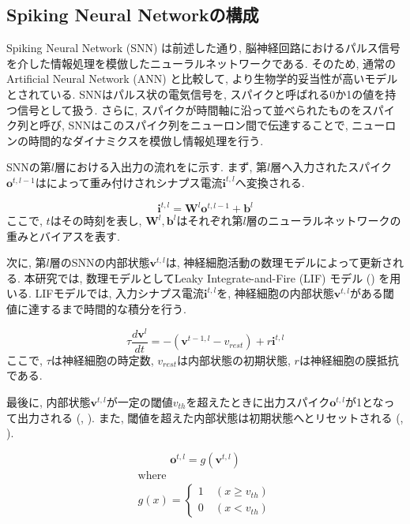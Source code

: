 \subsection{Spiking Neural Networkの構成}

Spiking Neural Network (SNN) は前述した通り, 脳神経回路におけるパルス信号を介した情報処理を模倣したニューラルネットワークである\cite{generalsnn}.
そのため, 通常のArtificial Neural Network (ANN) と比較して, より生物学的妥当性が高いモデルとされている.
SNNはパルス状の電気信号を, スパイクと呼ばれる0か1の値を持つ信号として扱う.
さらに, スパイクが時間軸に沿って並べられたものをスパイク列と呼び, SNNはこのスパイク列をニューロン間で伝達することで, ニューロンの時間的なダイナミクスを模倣し情報処理を行う.

SNNの第$l$層における入出力の流れをに示す.
まず, 第$l$層へ入力されたスパイク$\bm{o}^{t, l-1}$はによって重み付けされシナプス電流$\bm{i}^{t,l}$へ変換される.

\begin{equation}
    \bm{i}^{t, l} = \bm{W}^l\bm{o}^{t, l-1} + \bm{b}^l
    \label{eq:input_spike}
\end{equation}
ここで, $t$はその時刻を表し, $\bm{W}^l, \bm{b}^l$はそれぞれ第$l$層のニューラルネットワークの重みとバイアスを表す.

次に, 第$l$層のSNNの内部状態$\bm{v}^{t, l}$は, 神経細胞活動の数理モデルによって更新される.
本研究では, 数理モデルとしてLeaky Integrate-and-Fire (LIF) モデル () を用いる.
LIFモデルでは, 入力シナプス電流$\bm{i}^{t, l}$を, 神経細胞の内部状態$\bm{v}^{t, l}$がある閾値に達するまで時間的な積分を行う.

\begin{equation}
    {\tau}\frac{d\bm{v}^l}{dt}=-\left(\bm{v}^{t-1,l}-v_{rest}\right)+r\bm{i}^{t, l}
    \label{eq:lif}
\end{equation}
ここで, $\tau$は神経細胞の時定数, $v_{rest}$は内部状態の初期状態, $r$は神経細胞の膜抵抗である.

最後に, 内部状態$\bm{v}^{t, l}$が一定の閾値$v_{th}$を超えたときに出力スパイク$\bm{o}^{t, l}$が1となって出力される (, ).
また, 閾値を超えた内部状態は初期状態へとリセットされる (, ).

\begin{equation}
  \bm{o}^{t, l}=g\left(\bm{v}^{t, l}\right) \label{eq:outputSpike1:1}
\end{equation}
\begin{equation}
  \begin{split}
    \text{where} \hspace{3cm}\ \\
    g\left(x\right)=\left\{
      \begin{alignedat}{2}
        1 &\:\left(x{\geq}v_{th}\right)\\
        0 &\:\left(x{<}v_{th}\right)
      \end{alignedat}
    \right. \label{eq:outputSpike1:2}
  \end{split}
\end{equation}

